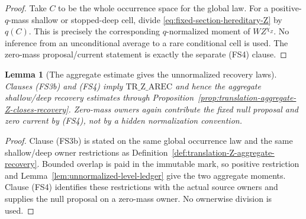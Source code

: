 \documentclass[11pt]{article}
\newtheorem{lemma}[theorem]{Lemma}
\begin{document}
\begin{proof}
Take $C$ to be the whole occurrence space for the global law.  For a
positive-$q$-mass shallow or stopped-deep cell, divide
\eqref{eq:fixed-section-hereditary-Z} by $q(C)$.  This is precisely the
corresponding $q$-normalized moment of $WZ^{\chi_Z}$.  No inference from an
unconditional average to a rare conditional cell is used.  The zero-mass
proposal/current statement is exactly the separate \textup{(FS4)} clause.
\end{proof}

\begin{lemma}[The aggregate estimate gives the unnormalized recovery laws]
\label{lem:fixed-section-aggregate-Z}
Clauses \textup{(FS3b)} and \textup{(FS4)} imply
$\mathrm{TR\_Z\_AREC}$ and hence the aggregate shallow/deep recovery
estimates through
Proposition~\ref{prop:translation-aggregate-Z-closes-recovery}.  Zero-mass
owners again contribute the fixed null proposal and zero current by
\textup{(FS4)}, not by a hidden normalization convention.
\end{lemma}

\begin{proof}
Clause \textup{(FS3b)} is stated on the same global occurrence law and the
same shallow/deep owner restrictions as
Definition~\ref{def:translation-Z-aggregate-recovery}.  Bounded overlap is
paid in the immutable mark, so positive restriction and
Lemma~\ref{lem:unnormalized-level-ledger} give the two aggregate moments.
Clause \textup{(FS4)} identifies these restrictions with the actual source
owners and supplies the null proposal on a zero-mass owner.  No ownerwise
division is used.
\end{proof}
\end{document}
